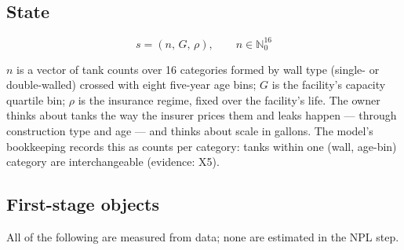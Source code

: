 \documentclass[
  letterpaper,
  DIV=11,
  numbers=noendperiod]{scrartcl}
\begin{document}
\subsection{State}\label{state}

\[
s = (n,\, G,\, \rho), \qquad n \in \mathbb{N}_0^{16}
\]

\(n\) is a vector of tank counts over 16 categories formed by wall type
(single- or double-walled) crossed with eight five-year age bins; \(G\)
is the facility's capacity quartile bin; \(\rho\) is the insurance
regime, fixed over the facility's life. The owner thinks about tanks the
way the insurer prices them and leaks happen --- through construction
type and age --- and thinks about scale in gallons. The model's
bookkeeping records this as counts per category: tanks within one (wall,
age-bin) category are interchangeable (evidence: X5).

\subsection{First-stage objects}\label{first-stage-objects}

All of the following are measured from data; none are estimated in the
NPL step.
\end{document}
